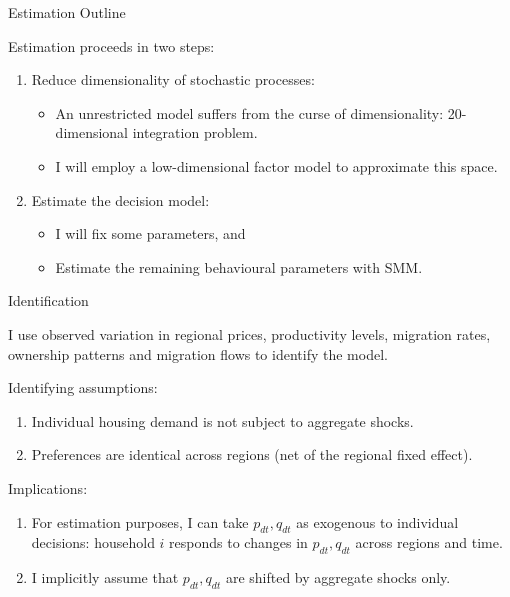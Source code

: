 \documentclass[12pt,english, aspectratio=169]{beamer}
\begin{document}
\begin{frame}{Estimation Outline\hypertarget{CurseDim}{}}

Estimation proceeds in two steps:
\begin{enumerate}
\item Reduce dimensionality of stochastic processes: 

\begin{itemize}
\item An unrestricted model suffers from the curse of dimensionality: 20-dimensional
integration problem. \hyperlink{CurseDimDetail}{}
\item I will employ a low-dimensional factor model to approximate this space.
\end{itemize}
\item Estimate the decision model:

\begin{itemize}
\item I will fix some parameters, and
\item Estimate the remaining behavioural parameters with SMM.
\end{itemize}
\end{enumerate}
\end{frame}

\begin{longv}
\begin{frame}{Identification}

\begin{midi}
\item I use observed variation in regional prices, productivity levels, migration rates, ownership patterns and migration flows to identify the model.
\item Identifying assumptions: 
\begin{enumerate}
\item Individual housing demand is not subject to aggregate shocks.
\item Preferences are identical across regions (net of the regional fixed effect).
\end{enumerate}
\pause
\item Implications:
\begin{enumerate}
\item For estimation purposes, I can take $p_{dt},q_{dt}$ as exogenous to individual decisions: household $i$ responds to changes in $p_{dt},q_{dt}$ across regions and time.
\item I implicitly assume that $p_{dt},q_{dt}$ are shifted by aggregate shocks only.
\end{enumerate}
\end{midi}

\end{frame}


\end{longv}
\end{document}
